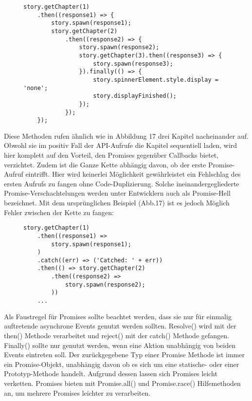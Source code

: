 \begin{figure}[H]
\begin{lstlisting}[basicstyle=\small]
story.getChapter(1)
    .then((response1) => {
        story.spawn(response1);
        story.getChapter(2)
            .then((response2) => {
                story.spawn(response2);
                story.getChapter(3).then((response3) => {
                    story.spawn(response3);
                }).finally(() => {
                    story.spinnerElement.style.display = 'none';
                    story.displayFinished();
                });
            });
    });
\end{lstlisting}
\end{figure}

\noindent
Diese Methoden rufen ähnlich wie in Abbildung 17 drei Kapitel nacheinander auf. Obwohl sie im positiv Fall der API-Aufrufe die Kapitel sequentiell laden, wird hier komplett auf den Vorteil, den Promises gegenüber Callbacks bietet, verzichtet. Zudem ist die Ganze Kette abhängig davon, ob der erste Promise-Aufruf eintrifft. Hier wird keinerlei Möglichkeit gewährleistet ein Fehlschlag des ersten Aufrufs zu fangen ohne Code-Duplizierung. Solche ineinandergegliederte Promise-Verschachtelungen werden unter Entwicklern auch als \glqq{}Promise-Hell\grqq{} bezeichnet.
Mit dem ursprünglichen Beispiel (Abb.17) ist es jedoch Möglich Fehler zwischen der Kette zu fangen:

\begin{figure}[H]
\begin{lstlisting}[basicstyle=\small]
story.getChapter(1)
    .then((response1) =>
        story.spawn(response1);
    )
    .catch((err) => ('Catched: ' + err))
    .then(() => story.getChapter(2)
        .then((response2) => 
            story.spawn(response2);
        ))
    ...
    \end{lstlisting}
\end{figure}

\noindent
Als Faustregel für Promises sollte beachtet werden, dass sie nur für einmalig auftretende asynchrone Events genutzt werden sollten. Resolve() wird mit der then() Methode verarbeitet und reject() mit der catch() Methode gefangen. Finally() sollte nur genutzt werden, wenn eine Aktion unabhängig von beiden Events eintreten soll. Der zurückgegebene Typ einer Promise Methode ist immer ein Promise-Objekt, unabhängig davon ob es sich um eine statische- oder einer Prototyp-Methode handelt. Aufgrund dessen lassen sich Promises leicht verketten. Promises bieten mit Promise.all() und Promise.race() Hilfemethoden an, um mehrere Promises leichter zu verarbeiten.

